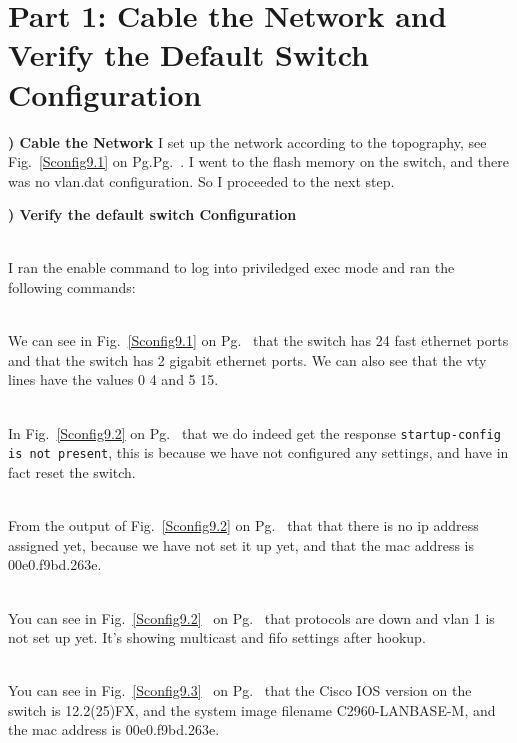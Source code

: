\documentclass{report}
\title{\classinfo}
\author{\semester}
\date{\today}
\newcommand{\mysection}[1]{\section*{#1}}
\newcommand{\mysubsection}[2]{\textbf{\romannumeral #1) #2}}
\begin{document}
\maketitle

\mysection{\textbf{Part 1: Cable the Network and Verify the Default Switch
Configuration}}

\mysubsection{1}{Cable the Network}
I set up the network according to the topography, see
Fig.~\ref{Sconfig9.1} on Pg.Pg.~\pageref{Sconfig9.1}. I went to the flash memory
on the switch, and there was no vlan.dat configuration. So I proceeded to the
next step. 
\hfill\break

\noindent\mysubsection{2}{Verify the default switch Configuration}

\\I ran the enable command to log into priviledged
exec mode and ran the following commands:
\hfill\break

\\We can see in Fig.~\ref{Sconfig9.1} on
Pg.~\pageref{Sconfig9.1} that the switch has 24 fast ethernet ports
and that the switch has 2 gigabit ethernet ports. We can also see that the
vty lines have the values 0 4 and 5 15.
\hfill\break

\\In Fig.~\ref{Sconfig9.2} on Pg.~\pageref{Sconfig9.2}
that we do indeed get the 
response {\scriptsize{\verb$startup-config is not present$}\normalsize}, 
this is because we have not configured any settings, and
have in fact reset the switch.
\hfill\break

\\From the output of Fig.~\ref{Sconfig9.2} on
Pg.~\pageref{Sconfig9.2} that that there is no ip address assigned yet, because
we have not set it up yet, and that the mac address is 00e0.f9bd.263e.
\hfill\break

\\You can see in Fig.~\ref{Sconfig9.2}~ 
on Pg.~\pageref{Sconfig9.2} that protocols are down and vlan 1 is not set up yet.
It's showing multicast and fifo settings after hookup.
\hfill\break

\\You can see in Fig.~\ref{Sconfig9.3}~ 
on Pg.~\pageref{Sconfig9.3} that the Cisco IOS version on the switch is
12.2(25)FX, and the system image filename C2960-LANBASE-M, and the mac address
is 00e0.f9bd.263e.
\hfill\break
\end{document}
